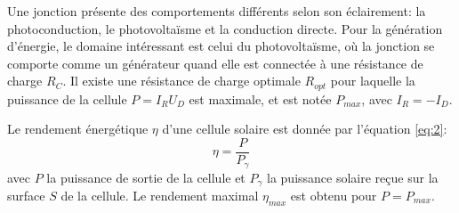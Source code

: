 Une jonction présente des comportements différents selon son éclairement: la photoconduction, le photovoltaïsme et la conduction directe.
Pour la génération d'énergie, le domaine intéressant est celui du photovoltaïsme, où la jonction se comporte comme un générateur quand elle est connectée à une résistance de charge \(R_C\).
Il existe une résistance de charge optimale \(R_{opt}\) pour laquelle la puissance de la cellule \(P = I_R U_D\) est maximale, et est notée \(P_{max}\), avec \(I_R = -I_D\).

Le rendement énergétique \(\eta\) d'une cellule solaire est donnée par l'équation \ref{eq:2}:
\begin{equation}
    \eta = \frac{P}{P_\gamma}
    \label{eq:2}
\end{equation}
avec \(P\) la puissance de sortie de la cellule et \(P_\gamma\) la puissance solaire reçue sur la surface \(S\) de la cellule.
Le rendement maximal \(\eta_{max}\) est obtenu pour \(P = P_{max}\).
